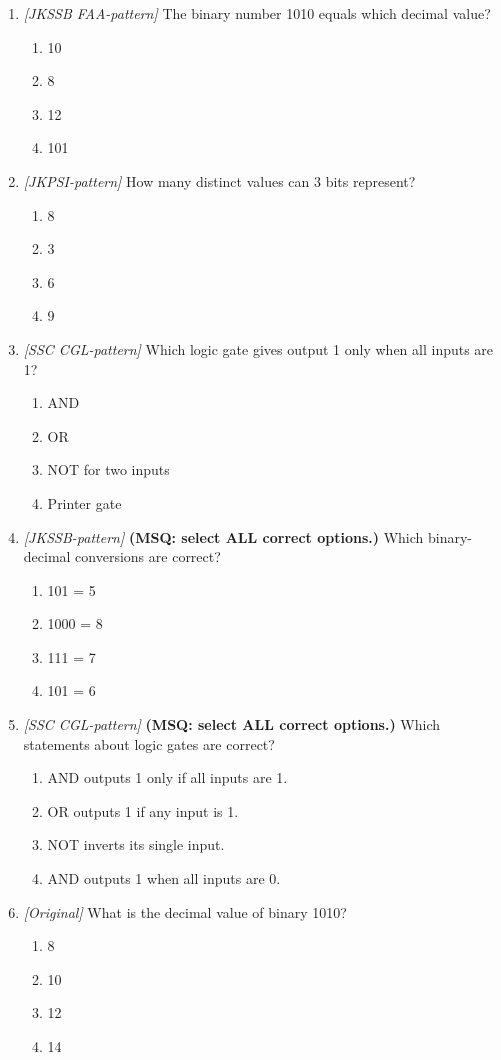 \begin{enumerate}[label=\textbf{Q\arabic*.}, leftmargin=*]
\item \textit{[JKSSB FAA-pattern]} The binary number 1010 equals which decimal value?
  \begin{enumerate}[label=\Alph*.]
    \item 10
    \item 8
    \item 12
    \item 101
  \end{enumerate}
\item \textit{[JKPSI-pattern]} How many distinct values can 3 bits represent?
  \begin{enumerate}[label=\Alph*.]
    \item 8
    \item 3
    \item 6
    \item 9
  \end{enumerate}
\item \textit{[SSC CGL-pattern]} Which logic gate gives output 1 only when all inputs are 1?
  \begin{enumerate}[label=\Alph*.]
    \item AND
    \item OR
    \item NOT for two inputs
    \item Printer gate
  \end{enumerate}
\item \textit{[JKSSB-pattern]} \textbf{(MSQ: select ALL correct options.)} Which binary-decimal conversions are correct?
  \begin{enumerate}[label=\Alph*.]
    \item 101 = 5
    \item 1000 = 8
    \item 111 = 7
    \item 101 = 6
  \end{enumerate}
\item \textit{[SSC CGL-pattern]} \textbf{(MSQ: select ALL correct options.)} Which statements about logic gates are correct?
  \begin{enumerate}[label=\Alph*.]
    \item AND outputs 1 only if all inputs are 1.
    \item OR outputs 1 if any input is 1.
    \item NOT inverts its single input.
    \item AND outputs 1 when all inputs are 0.
  \end{enumerate}
\item \textit{[Original]} What is the decimal value of binary 1010?
  \begin{enumerate}[label=\Alph*.]
\item 8
   \item 10
   \item 12
   \item 14
  \end{enumerate}


\end{enumerate}
